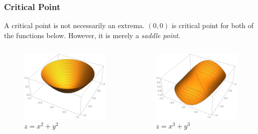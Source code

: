 \documentclass[10pt, t, allowdisplaybreaks]{beamer}
\renewcommand{\emph}[1]{{\color{Turquoise3}\textsl{#1}}}
\begin{document}
\begin{frame}
    \frametitle{Critical Point}
    A critical point is not necessarily an extrema. $(0,0)$ is critical point for both of the functions below. However, it is merely a \emph{saddle point}.
    \begin{columns}
        \begin{column}{0.5\textwidth}
            \begin{figure}[H]
                \centering
                \includegraphics[width=\textwidth]{Figures/2020-07-29-15-39-20.png}
                \caption{$z=x^2+y^2$}
            \end{figure}
        \end{column}
        \begin{column}{0.5\textwidth}
            \begin{figure}[H]
                \centering
                \includegraphics[width=\textwidth]{Figures/2020-07-29-15-40-05.png}
                \caption{$z=x^3+y^3$}
                \label{fig:}
            \end{figure}

        \end{column}
    \end{columns}
\end{frame}
\end{document}
